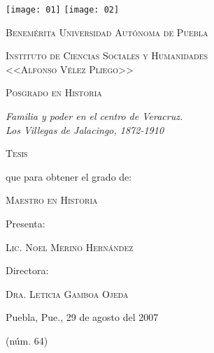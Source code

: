 \documentclass[14pt,twoside,final]{extbook} %
\begin{document}
\setcounter{page}{1}
\parindent=5mm %
\parskip=0mm %
\newpage
\thispagestyle{empty}
\begin{center}
\begin{minipage}{11cm}
\texttt{[image: 01]}\label{fig:buap} \hfill \texttt{[image: 02]}
\label{fig:icsyh}
\end{minipage}
\end{center}
\smallskip
\begin{center}
\large\scshape Benemérita Universidad Autónoma de Puebla
\end{center}
\begin{center}
\large\scshape Instituto de Ciencias Sociales y Humanidades \\

<<Alfonso Vélez Pliego>> 
\end{center}
\begin{center}
\large\scshape Posgrado en Historia
\end{center}
\bigskip
\begin{center}
\Large\itshape Familia y poder en el centro de Veracruz. \\ Los Villegas de Jalacingo, 1872-1910
\end{center}
\bigskip
\begin{center}
\Large\scshape Tesis
\end{center}
\bigskip
\begin{center}
que para obtener el grado de:
\end{center}
\begin{center}
\scshape Maestro en Historia
\end{center}
\begin{center}
Presenta:
\end{center}
\begin{center}
\scshape Lic. Noel Merino Hernández
\end{center}
\begin{center}
Directora:
\end{center}
\begin{center}
\scshape Dra. Leticia Gamboa Ojeda
\end{center}
\medskip
\begin{center}
Puebla, Pue., 29 de agosto del 2007
\end{center}
\begin{center}
(núm. 64)
\end{center}
\end{document}
